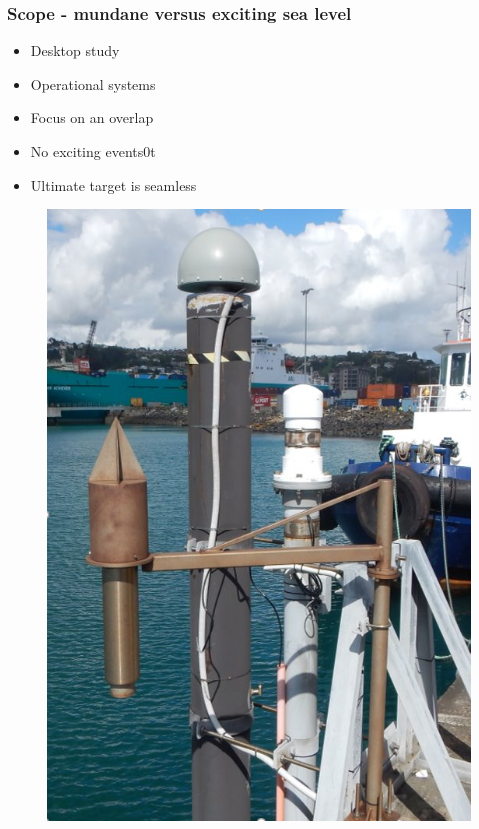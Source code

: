 \begin{frame}
\frametitle{Scope - mundane versus exciting sea level}
\begin{minipage}{0.45\textwidth}
    \begin{itemize}
        \item Desktop study
        \item Operational systems
        \item Focus on an overlap
        \item No exciting events0t
        \item Ultimate target is seamless
    \end{itemize}
\end{minipage}
\hfill
\begin{minipage}{0.45\textwidth}
    \begin{figure}      
    \includegraphics[width=\textwidth]{figures/images/tidegaugeEg.png}
    \end{figure}
\end{minipage}
\end{frame}

